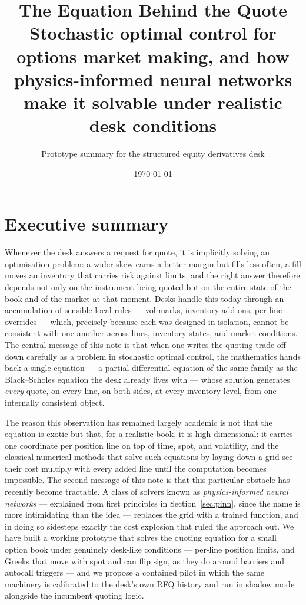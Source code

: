 \documentclass[11pt,a4paper]{article}
\title{\vspace{-1.2em}\Large\textbf{The Equation Behind the Quote}\\[0.3em]
\large Stochastic optimal control for options market making, and how
physics-informed neural networks make it solvable under realistic desk
conditions\vspace{-0.4em}}
\author{\normalsize Prototype summary for the structured equity derivatives desk}
\date{\normalsize \today}
\begin{document}
\maketitle
\vspace{-1.6em}

\section*{Executive summary}

Whenever the desk answers a request for quote, it is implicitly solving an
optimisation problem: a wider skew earns a better margin but fills less
often, a fill moves an inventory that carries risk against limits, and the
right answer therefore depends not only on the instrument being quoted but
on the entire state of the book and of the market at that moment. Desks
handle this today through an accumulation of sensible local rules ---
vol marks, inventory add-ons, per-line overrides --- which, precisely
because each was designed in isolation, cannot be consistent with one
another across lines, inventory states, and market conditions. The central
message of this note is that when one writes the quoting trade-off down
carefully as a problem in stochastic optimal control, the mathematics
hands back a single equation --- a partial differential equation of the
same family as the Black--Scholes equation the desk already lives with ---
whose solution generates \emph{every} quote, on every line, on both sides,
at every inventory level, from one internally consistent object.

The reason this observation has remained largely academic is not that the
equation is exotic but that, for a realistic book, it is
high-dimensional: it carries one coordinate per position line on top of
time, spot, and volatility, and the classical numerical methods that
solve such equations by laying down a grid see their cost multiply with
every added line until the computation becomes impossible. The second
message of this note is that this particular obstacle has recently become
tractable. A class of solvers known as \emph{physics-informed neural
networks} --- explained from first principles in
Section~\ref{sec:pinn}, since the name is more intimidating than the
idea --- replaces the grid with a trained function, and in doing so
sidesteps exactly the cost explosion that ruled the approach out. We have
built a working prototype that solves the quoting equation for a small
option book under genuinely desk-like conditions --- per-line position
limits, and Greeks that move with spot and can flip sign, as they do
around barriers and autocall triggers --- and we propose a contained
pilot in which the same machinery is calibrated to the desk's own RFQ
history and run in shadow mode alongside the incumbent quoting logic.
\end{document}
